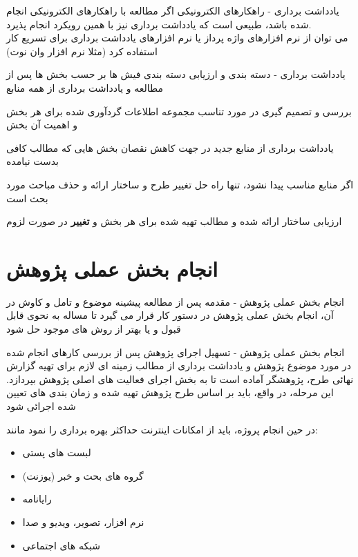 \documentclass[14pt]{beamer}
\makeatletter
\newcommand{\rtlist}{\raggedleft\rightskip\@totalleftmargin}
\newcommand{\sectionfontsize}{\fontsize{22pt}{0pt}\selectfont}
\newcommand{\framefontsizelarge}{\fontsize{18pt}{0pt}\selectfont}
\newcommand{\frametitlefontsize}{\fontsize{20pt}{0pt}\selectfont}
\newcommand{\defaultvspace}{\vspace{5mm}}
\makeatother
\begin{document}
\begin{persian}
	\begin{frame}{\frametitlefontsize یادداشت برداری - راهکارهای الکترونیکی}
		\framefontsizelarge
		اگر مطالعه با راهکارهای الکترونیکی انجام شده باشد، طبیعی است که یادداشت برداری نیز با همین رویکرد انجام پذیرد. \defaultvspace\\
		می توان از نرم افزارهای واژه پرداز یا نرم افزارهای یادداشت برداری برای تسریع کار استفاده کرد (مثلا نرم افزار وان نوت)
	\end{frame}
	
	\begin{frame}{\frametitlefontsize  یادداشت برداری - دسته بندی و ارزیابی }
		\framefontsizelarge
		دسته بندی فیش ها بر حسب بخش ها پس از مطالعه و یادداشت برداری از همه منابع
		
		بررسی و تصمیم گیری در مورد تناسب مجموعه اطلاعات گردآوری شده برای هر بخش و اهمیت آن بخش

		یادداشت برداری از منابع جدید در جهت کاهش نقصان بخش هایی که مطالب کافی بدست نیامده
		
		اگر منابع مناسب پیدا نشود، تنها راه حل تغییر طرح و ساختار ارائه و حذف مباحث مورد بحث است
		
		ارزیابی ساختار ارائه شده و مطالب تهیه شده برای هر بخش و \textbf{تغییر} در صورت لزوم
	\end{frame}
	
	\section{\sectionfontsize انجام بخش عملی پژوهش}	

	\begin{frame}{\frametitlefontsize  انجام بخش عملی پژوهش - مقدمه }
		\framefontsizelarge
		پس از مطالعه پیشینه موضوع و تامل و کاوش در آن، انجام بخش عملی پژوهش در دستور کار قرار می گیرد تا مساله به نحوی قابل قبول و یا بهتر از روش های موجود حل شود
	\end{frame}
	
	\begin{frame}{\frametitlefontsize  انجام بخش عملی پژوهش - تسهیل اجرای پژوهش }
		\framefontsizelarge
		پس از بررسی کارهای انجام شده در مورد موضوع پژوهش و یادداشت برداری از مطالب زمینه ای لازم برای تهیه گزارش نهائی طرح، پژوهشگر آماده است تا به بخش اجرای فعالیت های اصلی پژوهش بپردازد. این مرحله، در واقع، باید بر اساس طرح پژوهش تهیه شده و زمان بندی های تعیین شده اجرائی شود
		
		در حین انجام پروژه، باید از امکانات اینترنت حداکثر بهره برداری را نمود مانند:
		\begin{itemize}\rtlist
			\item لبست های پستی
			\item گروه های بحث و خبر (یوزنت)
			\item رایانامه
			\item نرم افزار، تصویر، ویدیو و صدا
			\item شبکه های اجتماعی
		\end{itemize}
	\end{frame}
	

\end{persian}
\end{document}

